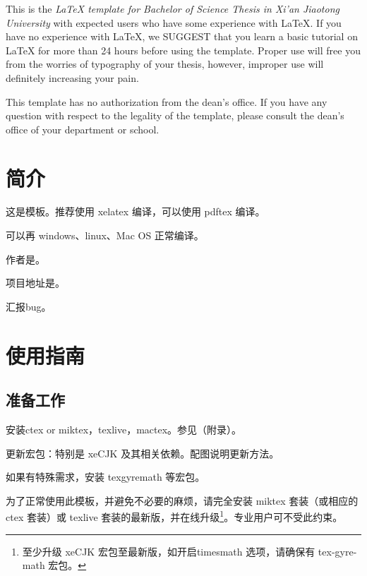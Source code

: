 \documentclass[%
               print, 
               timesmath
              ]{xjtubsc}
\begin{document}

\begin{abstracten} %

This is the \emph{\LaTeX{} template for Bachelor of Science Thesis in Xi'an Jiaotong University} with expected users who have some experience with \LaTeX{}. If you have no experience with \LaTeX{}, we SUGGEST that you learn a basic tutorial on \LaTeX{} for more than 24 hours before using the template. Proper use will free you from the worries of typography of your thesis, however, improper use will definitely increasing your pain.

This template has no authorization from the dean's office. If you have any question with respect to the legality of the template, please consult the dean's office of your department or school.

\end{abstracten}


\tableofcontents %


\mainmatter


\section{简介}
这是模板。推荐使用 xelatex 编译，可以使用 pdftex 编译。

可以再 windows、linux、Mac OS 正常编译。

作者是。

项目地址是。

汇报bug。

\section{使用指南}
\subsection{准备工作}

安装ctex or miktex，texlive，mactex。参见（附录）。

更新宏包：特别是 xeCJK 及其相关依赖。配图说明更新方法。

如果有特殊需求，安装 texgyremath 等宏包。 

为了正常使用此模板，并避免不必要的麻烦，请完全安装 miktex 套装（或相应的 ctex 套装）或 texlive 套装的最新版，并在线升级\footnote{至少升级 xeCJK 宏包至最新版，如开启timesmath 选项，请确保有 tex-gyre-math 宏包。}。专业用户可不受此约束。
\end{document}
